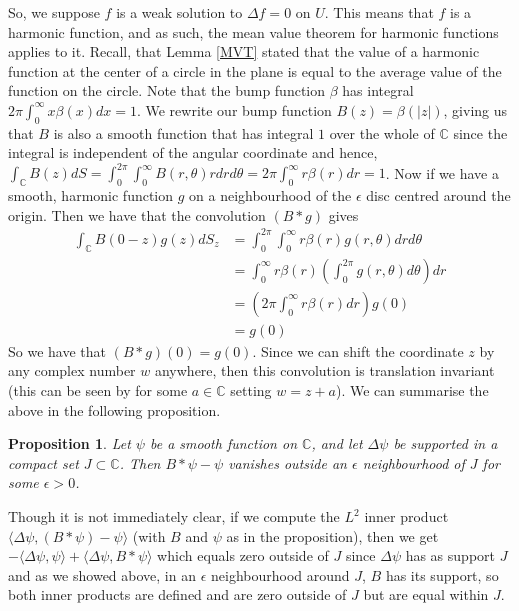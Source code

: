 \documentclass[11pt]{report}
\newtheorem{prop}[thm]{Proposition}
\theoremstyle{definition}
\begin{document}
So, we suppose $f$ is a weak solution to $\Delta f = 0$ on $U$. This means that $f$ is a harmonic function, and as such, the mean value theorem for harmonic functions applies to it. Recall, that Lemma \ref{MVT} stated that the value of a harmonic function at the center of a circle in the plane is equal to the average value of the function on the circle. Note that the bump function $\beta$ has integral $2\pi\int_0^{\infty}x\beta(x)dx = 1$. We rewrite our bump function $B(z)=\beta(|z|)$, giving us that $B$ is also a smooth function that has integral $1$ over the whole of $\mathbb{C}$ since the integral is independent of the angular coordinate and hence, $\int_{\mathbb{C}}B(z)dS=\int_0^{2\pi}\int_0^{\infty}B(r,\theta)rdrd\theta = 2\pi\int_0^{\infty}r\beta(r)dr = 1$. Now if we have a smooth, harmonic function $g$ on a neighbourhood of the $\epsilon$ disc centred around the origin. Then we have that the convolution $(B*g)$ gives
\begin{align*}
  \int_{\mathbb{C}}B(0-z)g(z)dS_z &= \int_0^{2\pi}\int_0^{\infty}r\beta(r)g(r,\theta)drd\theta \\
  &= \int_0^{\infty}r\beta(r)\left(\int_0^{2\pi}g(r,\theta)d\theta\right) dr \\
  &= \left(2\pi\int_0^{\infty}r\beta(r) dr\right) g(0) \\
  &=g(0)
\end{align*}
So we have that $(B*g)(0) = g(0)$. Since we can shift the coordinate $z$ by any complex number $w$ anywhere, then this convolution is translation invariant (this can be seen by for some $a \in \mathbb{C}$ setting $w = z + a$). We can summarise the above in the following proposition.
\begin{prop}
  Let $\psi$ be a smooth function on $\mathbb{C}$, and let $\Delta \psi$ be supported in a compact set $J \subset \mathbb{C}$. Then $B*\psi - \psi$ vanishes outside an $\epsilon$ neighbourhood of $J$ for some $\epsilon > 0$.
\end{prop}

Though it is not immediately clear, if we compute the $L^2$ inner product $\langle \Delta \psi, (B*\psi) - \psi \rangle$ (with $B$ and $\psi$ as in the proposition), then we get $-\langle \Delta \psi, \psi \rangle + \langle \Delta \psi, B*\psi \rangle$ which equals zero outside of $J$ since $\Delta \psi$ has as support $J$ and as we showed above, in an $\epsilon$ neighbourhood around $J$, $B$ has its support, so both inner products are defined and are zero outside of $J$ but are equal within $J$.  
\end{document}
